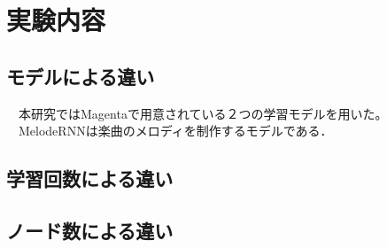 \chapter{実験内容}
\section{モデルによる違い}
　本研究ではMagentaで用意されている２つの学習モデルを用いた。\\
　MelodeRNNは楽曲のメロディを制作するモデルである．
\section{学習回数による違い}
\section{ノード数による違い}